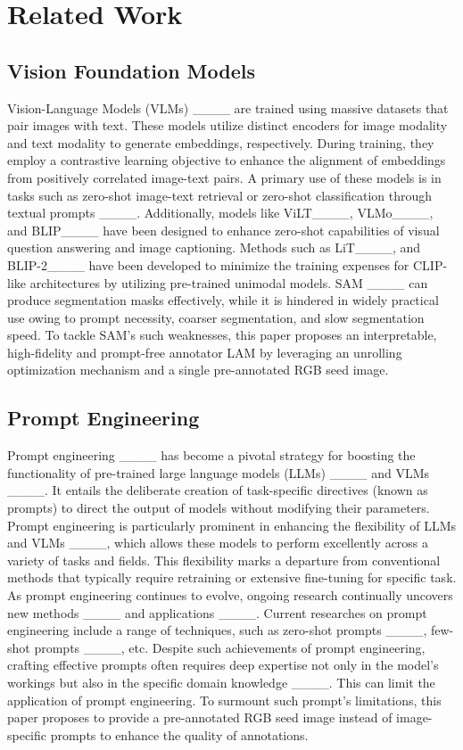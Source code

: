 \section{Related Work}
\vspace{-0.1cm}
\label{related_work}
\subsection{Vision Foundation Models}
Vision-Language Models (VLMs) ____ are trained using massive datasets that pair images with text. These models utilize distinct encoders for image modality and text modality to generate embeddings, respectively. During training, they employ a contrastive learning objective to enhance the alignment of embeddings from positively correlated image-text pairs. A primary use of these models is in tasks such as zero-shot image-text retrieval or zero-shot classification through textual prompts ____. Additionally, models like ViLT____, VLMo____, and BLIP____ have been designed to enhance zero-shot capabilities of visual question answering and image captioning. Methods such as LiT____, and BLIP-2____ have been developed to minimize the training expenses for CLIP-like architectures by utilizing pre-trained unimodal models. SAM ____ can produce segmentation masks effectively, while it is hindered in widely practical use owing to prompt necessity, coarser segmentation, and slow segmentation speed. To tackle SAM's such weaknesses, this paper proposes an interpretable, high-fidelity and prompt-free annotator LAM by leveraging an unrolling optimization mechanism and a single pre-annotated RGB seed image. 

\subsection{Prompt Engineering}
\vspace{-0.1cm}
Prompt engineering ____ has become a pivotal strategy for boosting the functionality of pre-trained large language models (LLMs) ____ and VLMs ____. It entails the deliberate creation of task-specific directives (known as prompts) to direct the output of models without modifying their parameters. Prompt engineering is particularly prominent in enhancing the flexibility of LLMs and VLMs ____, which allows these models to perform excellently across a variety of tasks and fields. This flexibility marks a departure from conventional methods that typically require retraining or extensive fine-tuning for specific task. As prompt engineering continues to evolve, ongoing research continually uncovers new methods ____ and applications ____. Current researches on prompt engineering include a range of techniques, such as zero-shot prompts ____, few-shot prompts ____, etc. Despite such achievements of prompt engineering, crafting effective prompts often requires deep expertise not only in the model's workings but also in the specific domain knowledge ____. This can limit the application of prompt engineering. To surmount such prompt's limitations, this paper proposes to provide a pre-annotated RGB seed image instead of image-specific prompts to enhance the quality of annotations.